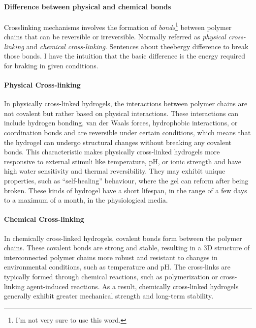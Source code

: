 \paragraph{Difference between physical and chemical bonds}
Crosslinking mechanisms involves the formation of \textit{bonds}\footnote{I'm not very sure to use this word.} between polymer chains that can be reversible or irreversible.
Normally referred as \textit{physical cross-linking} and \textit{chemical cross-linking}.
Sentences about theebergy difference to break those bonds.
I have the intuition that the basic difference is the energy required for braking in given conditions.


\paragraph{Physical Cross-linking}\citep{priyaComprehensiveReviewHydrogel2024}
In physically cross-linked hydrogels, the interactions between polymer chains are not covalent but rather based on physical interactions. 
These interactions can include hydrogen bonding, van der Waals forces, hydrophobic interactions, or coordination bonds and are reversible under certain conditions, which means that the hydrogel can undergo structural changes without breaking any covalent bonds.
This characteristic makes physically cross-linked hydrogels more responsive to external stimuli like temperature, pH, or ionic strength and have high water sensitivity and thermal reversibility. 
They may exhibit unique properties, such as “self-healing” behaviour, where the gel can reform after being broken.
These kinds of hydrogel have a short lifespan, in the range of a few days to a maximum of a month, in the physiological media. 


\paragraph{Chemical Cross-linking}\citep{priyaComprehensiveReviewHydrogel2024}
In chemically cross-linked hydrogels, covalent bonds form between the polymer chains.
These covalent bonds are strong and stable, resulting in a 3D structure of interconnected polymer chains more robust and resistant to changes in environmental conditions, such as temperature and pH. 
The cross-links are typically formed through chemical reactions, such as polymerization or cross-linking agent-induced reactions. 
As a result, chemically cross-linked hydrogels generally exhibit greater mechanical strength and long-term stability. 

